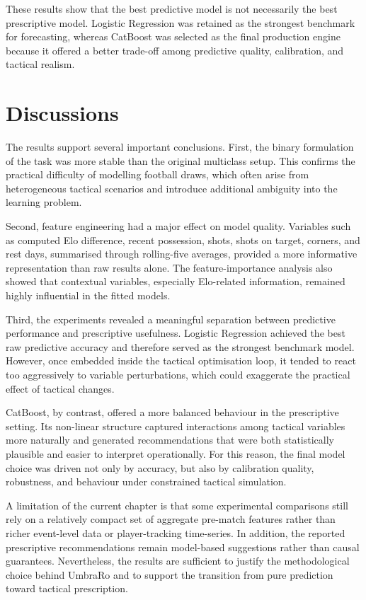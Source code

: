 These results show that the best predictive model is not necessarily the best prescriptive model. Logistic Regression was retained as the strongest benchmark for forecasting, whereas CatBoost was selected as the final production engine because it offered a better trade-off among predictive quality, calibration, and tactical realism.

\section{Discussions}
\label{sec:discussion}

The results support several important conclusions. First, the binary formulation of the task was more stable than the original multiclass setup. This confirms the practical difficulty of modelling football draws, which often arise from heterogeneous tactical scenarios and introduce additional ambiguity into the learning problem.

Second, feature engineering had a major effect on model quality. Variables such as computed Elo difference, recent possession, shots, shots on target, corners, and rest days, summarised through rolling-five averages, provided a more informative representation than raw results alone. The feature-importance analysis also showed that contextual variables, especially Elo-related information, remained highly influential in the fitted models.

Third, the experiments revealed a meaningful separation between predictive performance and prescriptive usefulness. Logistic Regression achieved the best raw predictive accuracy and therefore served as the strongest benchmark model. However, once embedded inside the tactical optimisation loop, it tended to react too aggressively to variable perturbations, which could exaggerate the practical effect of tactical changes.

CatBoost, by contrast, offered a more balanced behaviour in the prescriptive setting. Its non-linear structure captured interactions among tactical variables more naturally and generated recommendations that were both statistically plausible and easier to interpret operationally. For this reason, the final model choice was driven not only by accuracy, but also by calibration quality, robustness, and behaviour under constrained tactical simulation.

A limitation of the current chapter is that some experimental comparisons still rely on a relatively compact set of aggregate pre-match features rather than richer event-level data or player-tracking time-series. In addition, the reported prescriptive recommendations remain model-based suggestions rather than causal guarantees. Nevertheless, the results are sufficient to justify the methodological choice behind UmbraRo and to support the transition from pure prediction toward tactical prescription.

